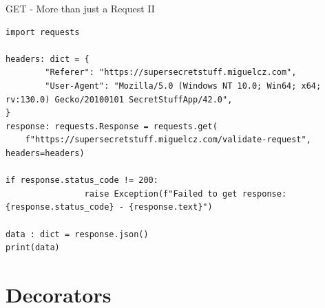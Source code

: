 \documentclass[12pt, aspectratio=169, usepdftitle=false]{beamer}
\begin{document}
\begin{frame}[fragile]{GET - More than just a Request II}
	
	\begin{lstlisting}[language=pytiny]
import requests
	
headers: dict = {
		"Referer": "https://supersecretstuff.miguelcz.com",
		"User-Agent": "Mozilla/5.0 (Windows NT 10.0; Win64; x64; rv:130.0) Gecko/20100101 SecretStuffApp/42.0",
}
response: requests.Response = requests.get(
    f"https://supersecretstuff.miguelcz.com/validate-request", headers=headers)

if response.status_code != 200:
				raise Exception(f"Failed to get response: {response.status_code} - {response.text}")
	
data : dict = response.json()
print(data)

	\end{lstlisting}
\end{frame}

%	
%
%
%
%
%




{}


\section{Decorators}
\end{document}
